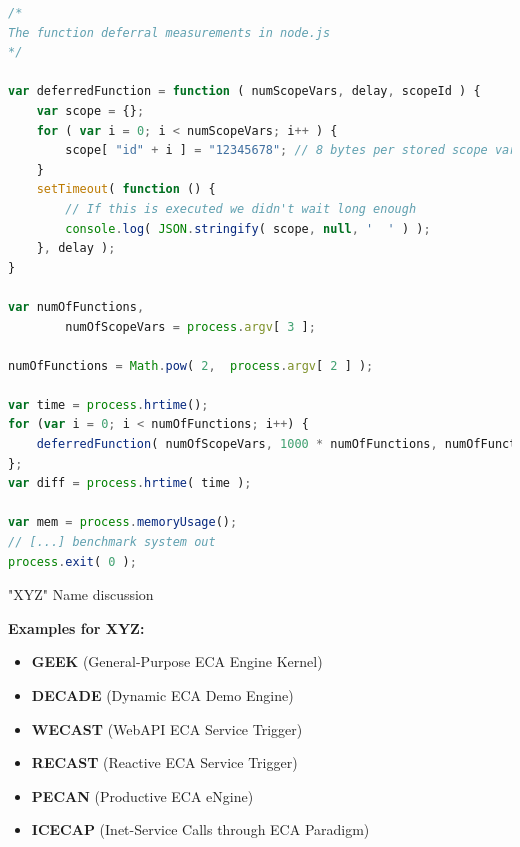 \begin{lstlisting}[frame=single,float=h,label=lst_bm_js,language=JavaScript,caption=Closure Benchmarking: JavaScript Code]
/*
The function deferral measurements in node.js
*/

var deferredFunction = function ( numScopeVars, delay, scopeId ) {
	var scope = {};
	for ( var i = 0; i < numScopeVars; i++ ) {
		scope[ "id" + i ] = "12345678"; // 8 bytes per stored scope variable
	}
	setTimeout( function () {
		// If this is executed we didn't wait long enough
		console.log( JSON.stringify( scope, null, '  ' ) );
	}, delay );
}

var numOfFunctions,
		numOfScopeVars = process.argv[ 3 ];

numOfFunctions = Math.pow( 2,  process.argv[ 2 ] );

var time = process.hrtime();
for (var i = 0; i < numOfFunctions; i++) {
	deferredFunction( numOfScopeVars, 1000 * numOfFunctions, numOfFunctions + "(" + i + ")" );
};
var diff = process.hrtime( time );

var mem = process.memoryUsage();
// [...] benchmark system out
process.exit( 0 );

\end{lstlisting}


\newpage
{\huge "XYZ" Name discussion}



\textbf{Examples for XYZ:}
\begin{itemize}
  \item \textbf{GEEK} (General-Purpose ECA Engine Kernel)
  \item \textbf{DECADE} (Dynamic ECA Demo Engine)
  \item \textbf{WECAST} (WebAPI ECA Service Trigger)
  \item \textbf{RECAST} (Reactive ECA Service Trigger)
  \item \textbf{PECAN} (Productive ECA eNgine)
  \item \textbf{ICECAP} (Inet-Service Calls through ECA Paradigm)
\end{itemize}
